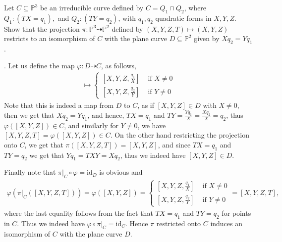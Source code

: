 \documentclass[12pt]{article}
\begin{document}
\begin{prob}
    Let $C \subseteq \mathbb{P}^3$ be an irreducible curve defined by $C = Q_1 \cap Q_2$, where $Q_1 : (TX = q_1),$ and $Q_2 : (TY = q_2)$, with $q_1,q_2$ quadratic forms in $X,Y,Z$. Show that the projection $\pi : \mathbb{P}^3  \dashrightarrow \mathbb{P}^2$ defined by $(X,Y,Z,T) \mapsto (X,Y,Z)$ restricts to an isomorphism of $C$ with the plane curve $D \subseteq \mathbb{P}^2$ given by $Xq_2 = Yq_1$.
\end{prob}
    
    \sol.
    Let us define the map $\varphi : D \dashrightarrow C$, as follows, 
    \begin{align*}
        [X,Y,Z] \mapsto \begin{cases} [X,Y,Z,\frac{q_1}{X}] & \mbox{ if } X \neq 0 \\ 
        [X,Y,Z,\frac{q_2}{Y}] & \mbox{ if } Y \neq 0 \end{cases}
    \end{align*}
    Note that this is indeed a map from $D$ to $C$, as if $[X,Y,Z] \in D$ with $X \neq 0$, then we get that $Xq_2 = Yq_1$, and hence, $TX = q_1$ and $TY = \frac{Yq_1}{X} = \frac{Xq_2}{X} = q_2$, thus $\varphi([X,Y,Z]) \in C$, and similarly for $Y \neq 0$, we have $[X,Y,Z,T] = \varphi([X,Y,Z]) \in C$. On the other hand restricting the projection onto $C$, we get that $\pi([X,Y,Z,T]) = [X,Y,Z]$, and since $TX = q_1$ and $TY = q_2 $ we get that $Yq_1 = TXY = Xq_2$, thus we indeed have $[X,Y,Z] \in D$. 
    
    Finally note that $\pi\vert_C \circ \varphi = \mathrm{id}_D$ is obvious and 
    \begin{align*}
        \varphi(\pi\vert_C([X,Y,Z,T])) = \varphi([X,Y,Z]) = \begin{cases}
            [X,Y,Z,\frac{q_1}{X}] & \mbox{ if } X \neq 0 \\ 
            [X,Y,Z,\frac{q_2}{Y}] & \mbox{ if } Y \neq 0 
        \end{cases} = [X,Y,Z,T],
    \end{align*}
    where the last equality follows from the fact that $TX = q_1$ and $TY = q_2$ for points in $C$. Thus we indeed have $\varphi \circ \pi\vert_C = \mathrm{id}_C$. Hence $\pi$ restricted onto $C$ induces an isomorphism of $C$ with the plane curve $D$.
\end{document}
